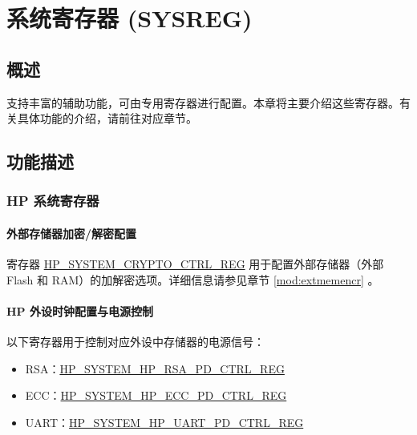 \documentclass[main\_\_CN.tex]{subfiles}
\begin{document}

\ifglobal
\else
    {\let\clearpage\relax \listoftodos}
    \tableofcontents
\fi



\chapter{系统寄存器 (SYSREG)}
\label{mod:sysreg}
\hypertarget{sysreg}{}

\section{概述}

\chipname{} 支持丰富的辅助功能，可由专用寄存器进行配置。本章将主要介绍这些寄存器。有关具体功能的介绍，请前往对应章节。

\section{功能描述}

\subsection{HP 系统寄存器}

\subsubsection{外部存储器加密/解密配置}

寄存器 \hyperref[regdesc:HPSYSTEMCRYPTOCTRLREG]{HP\_SYSTEM\_CRYPTO\_CTRL\_REG} 用于配置外部存储器（外部 Flash 和 RAM）的加解密选项。详细信息请参见章节 \ref{mod:extmemencr} \textit{}。

\subsubsection{HP 外设时钟配置与电源控制}

以下寄存器用于控制对应外设中存储器的电源信号：
\begin{itemize}
    \item RSA：\hyperref[regdesc:HPSYSTEMHPRSAPDCTRLREG]{HP\_SYSTEM\_HP\_RSA\_PD\_CTRL\_REG}
    \item ECC：\hyperref[regdesc:HPSYSTEMHPECCPDCTRLREG]{HP\_SYSTEM\_HP\_ECC\_PD\_CTRL\_REG}
    \item UART：\hyperref[regdesc:HPSYSTEMHPUARTPDCTRLREG]{HP\_SYSTEM\_HP\_UART\_PD\_CTRL\_REG}
\end{itemize}
\end{document}
